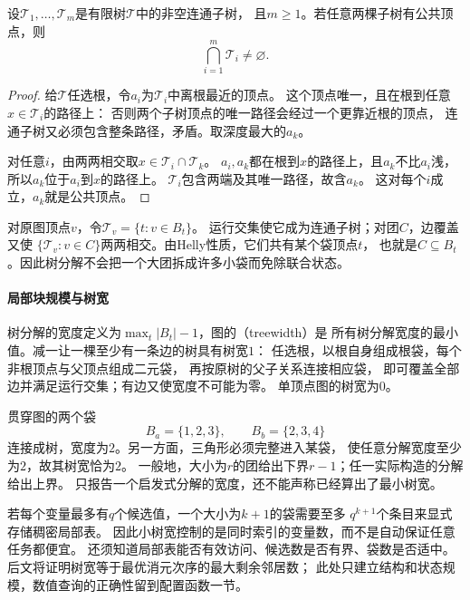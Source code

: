 \begin{lemma}
  \label{lem:graph-theory-subtree-helly}
  设\(\mathcal T_1,\ldots,\mathcal T_m\)是有限树\(\mathcal T\)中的非空连通子树，
  且\(m\geq1\)。若任意两棵子树有公共顶点，则
  \[
    \bigcap_{i=1}^{m}\mathcal T_i\neq\varnothing.
  \]
\end{lemma}

\begin{proof}
给\(\mathcal T\)任选根，令\(a_i\)为\(\mathcal T_i\)中离根最近的顶点。
这个顶点唯一，且在根到任意\(x\in\mathcal T_i\)的路径上：
否则两个子树顶点的唯一路径会经过一个更靠近根的顶点，
连通子树又必须包含整条路径，矛盾。取深度最大的\(a_k\)。

对任意\(i\)，由两两相交取\(x\in\mathcal T_i\cap\mathcal T_k\)。
\(a_i,a_k\)都在根到\(x\)的路径上，且\(a_k\)不比\(a_i\)浅，
所以\(a_k\)位于\(a_i\)到\(x\)的路径上。
\(\mathcal T_i\)包含两端及其唯一路径，故含\(a_k\)。
这对每个\(i\)成立，\(a_k\)就是公共顶点。
\end{proof}

对原图顶点\(v\)，令\(\mathcal T_v=\{t:v\in B_t\}\)。
运行交集使它成为连通子树；对团\(C\)，边覆盖又使
\(\{\mathcal T_v:v\in C\}\)两两相交。由Helly性质，它们共有某个袋顶点\(t\)，
也就是\(C\subseteq B_t\)。因此树分解不会把一个大团拆成许多小袋而免除联合状态。

\paragraph{局部块规模与树宽}

树分解的宽度定义为\(\max_t|B_t|-1\)，图的（treewidth）是
所有树分解宽度的最小值。减一让一棵至少有一条边的树具有树宽\(1\)：
任选根，以根自身组成根袋，每个非根顶点与父顶点组成二元袋，
再按原树的父子关系连接相应袋，
即可覆盖全部边并满足运行交集；有边又使宽度不可能为零。
单顶点图的树宽为\(0\)。

贯穿图的两个袋
\[
  B_a=\{1,2,3\},\qquad B_b=\{2,3,4\}
\]
连接成树，宽度为\(2\)。另一方面，三角形必须完整进入某袋，
使任意分解宽度至少为\(2\)，故其树宽恰为\(2\)。
一般地，大小为\(r\)的团给出下界\(r-1\)；任一实际构造的分解给出上界。
只报告一个启发式分解的宽度，还不能声称已经算出了最小树宽。

若每个变量最多有\(q\)个候选值，一个大小为\(k+1\)的袋需要至多
\(q^{k+1}\)个条目来显式存储稠密局部表。
因此小树宽控制的是同时索引的变量数，而不是自动保证任意任务都便宜。
还须知道局部表能否有效访问、候选数是否有界、袋数是否适中。
后文将证明树宽等于最优消元次序的最大剩余邻居数；
此处只建立结构和状态规模，数值查询的正确性留到配置函数一节。

